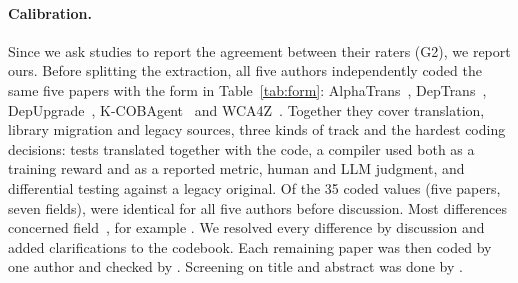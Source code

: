 \begin{added}
\paragraph{Calibration.} Since we ask studies to report the agreement between their raters (G2), we report ours. Before splitting the extraction, all five authors independently coded the same five papers with the form in Table~\ref{tab:form}: AlphaTrans~\cite{alphatrans}, DepTrans~\cite{dgir}, DepUpgrade~\cite{depupgrade}, K-COBAgent~\cite{kcobagent} and WCA4Z~\cite{wca4z}. Together they cover translation, library migration and legacy sources, three kinds of track and the hardest coding decisions: tests translated together with the code, a compiler used both as a training reward and as a reported metric, human and LLM judgment, and differential testing against a legacy original. Of the 35 coded values (five papers, seven fields),  were identical for all five authors before discussion. Most differences concerned field~, for example . We resolved every difference by discussion and added  clarifications to the codebook. Each remaining paper was then coded by one author and checked by . Screening on title and abstract was done by .
\end{added}


